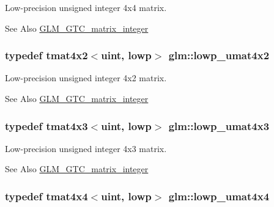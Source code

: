 Low-\/precision unsigned integer 4x4 matrix. \begin{DoxySeeAlso}{See Also}
\hyperlink{group__gtc__matrix__integer}{G\-L\-M\-\_\-\-G\-T\-C\-\_\-matrix\-\_\-integer} 
\end{DoxySeeAlso}
\hypertarget{group__gtc__matrix__integer_ga5f4e6bb892b20b532bd9caa9aee120b9}{
\subsubsection[{lowp\-\_\-umat4x2}]{\setlength{\rightskip}{0pt plus 5cm}typedef tmat4x2$<$uint, lowp$>$ {\bf glm\-::lowp\-\_\-umat4x2}}}\label{group__gtc__matrix__integer_ga5f4e6bb892b20b532bd9caa9aee120b9}
Low-\/precision unsigned integer 4x2 matrix. \begin{DoxySeeAlso}{See Also}
\hyperlink{group__gtc__matrix__integer}{G\-L\-M\-\_\-\-G\-T\-C\-\_\-matrix\-\_\-integer} 
\end{DoxySeeAlso}
\hypertarget{group__gtc__matrix__integer_gae94cb13770f09d0a086e6fb627f47b84}{
\subsubsection[{lowp\-\_\-umat4x3}]{\setlength{\rightskip}{0pt plus 5cm}typedef tmat4x3$<$uint, lowp$>$ {\bf glm\-::lowp\-\_\-umat4x3}}}\label{group__gtc__matrix__integer_gae94cb13770f09d0a086e6fb627f47b84}
Low-\/precision unsigned integer 4x3 matrix. \begin{DoxySeeAlso}{See Also}
\hyperlink{group__gtc__matrix__integer}{G\-L\-M\-\_\-\-G\-T\-C\-\_\-matrix\-\_\-integer} 
\end{DoxySeeAlso}
\hypertarget{group__gtc__matrix__integer_ga6ec13ea43b4328e29219f8515c188997}{
\subsubsection[{lowp\-\_\-umat4x4}]{\setlength{\rightskip}{0pt plus 5cm}typedef tmat4x4$<$uint, lowp$>$ {\bf glm\-::lowp\-\_\-umat4x4}}}\label{group__gtc__matrix__integer_ga6ec13ea43b4328e29219f8515c188997}
